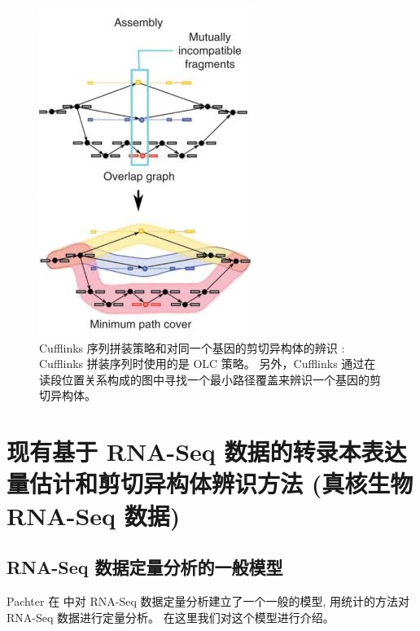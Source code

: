 \begin{figure}[!t]
\centering
\includegraphics[height=0.5\textheight]{figures/cufflinks-assembly.jpg}
\caption[Cufflinks 序列拼装策略和对同一个基因的剪切异构体的辨识 \cite{cufflinks.2010}]
{Cufflinks 序列拼装策略和对同一个基因的剪切异构体的辨识 \cite{cufflinks.2010}: 
Cufflinks 拼装序列时使用的是 OLC 策略。
另外，Cufflinks 通过在读段位置关系构成的图中寻找一个最小路径覆盖来辨识一个基因的剪切异构体。}
\label{intro-cufflinks-assembly}
\end{figure}


\section{现有基于 RNA-Seq 数据的转录本表达量估计和剪切异构体辨识方法 (真核生物 RNA-Seq 数据)}
\label{intro-rna-seq-tools-summary}

\subsection{RNA-Seq 数据定量分析的一般模型}
\label{rna-seq-general-model}

Pachter 在  中对 RNA-Seq 
数据定量分析建立了一个一般的模型, 
用统计的方法对 RNA-Seq 数据进行定量分析。 在这里我们对这个模型进行介绍。 

